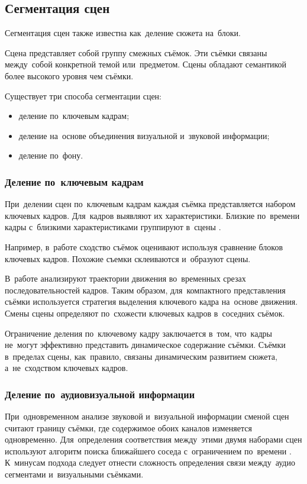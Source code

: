 \subsection{Сегментация сцен}

Сегментация сцен также известна как~деление сюжета на~блоки.

Сцена представляет собой группу смежных съёмок.
Эти съёмки связаны между~собой конкретной темой или~предметом.
Сцены обладают семантикой более высокого уровня чем съёмки.

Существует три способа сегментации сцен:
\begin{itemize}
    \item деление по~ключевым кадрам;
    \item деление на~основе объединения визуальной и~звуковой информации;
    \item деление по~фону.
\end{itemize}


\subsubsection{Деление по~ключевым кадрам}

При~делении сцен по~ключевым кадрам каждая съёмка представляется набором
ключевых кадров. Для~кадров выявляют их характеристики.
Близкие по~времени кадры с~близкими
характеристиками группируют в~сцены \cite{Truong:2003}.

Например, в~работе \cite{Hanjalic:2002} сходство съёмок оценивают
используя сравнение блоков ключевых кадров.
Похожие съемки склеиваются и~образуют сцены.

В~работе \cite{Ngo:2000} анализируют траектории движения
во~временных срезах последовательностей кадров.
Таким образом, для~компактного представления съёмки
используется стратегия выделения ключевого кадра на~основе движения.
Смены сцены определяют по~схожести ключевых кадров в~соседних съёмок.

Ограничение деления по~ключевому кадру заключается в~том, что~кадры
не~могут эффективно представить динамическое содержание съёмки.
Съёмки в~пределах сцены, как~правило, связаны динамическим развитием сюжета,
а~не~сходством ключевых кадров.


\subsubsection{Деление по~аудиовизуальной информации}

При~одновременном анализе звуковой и~визуальной информации сменой сцен считают
границу съёмки, где содержимое обоих каналов изменяется одновременно.
Для~определения соответствия между~этими двумя наборами сцен
используют алгоритм поиска ближайшего соседа
с~ограничением по~времени \cite{Sundaram:2000}.
К~минусам подхода следует отнести сложность
определения связи между~аудио сегментами и~визуальными съёмками.


